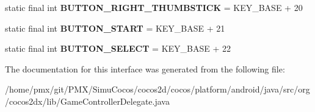 \begin{DoxyCompactItemize}
\item 
\mbox{\label{interfaceorg_1_1cocos2dx_1_1lib_1_1GameControllerDelegate_a57dc771b8eb196a53e62ec73d3569b28}} 
static final int {\bfseries B\+U\+T\+T\+O\+N\+\_\+\+R\+I\+G\+H\+T\+\_\+\+T\+H\+U\+M\+B\+S\+T\+I\+CK} = K\+E\+Y\+\_\+\+B\+A\+SE + 20
\item 
\mbox{\label{interfaceorg_1_1cocos2dx_1_1lib_1_1GameControllerDelegate_a2ddcf5d70780771554d0117c041673f6}} 
static final int {\bfseries B\+U\+T\+T\+O\+N\+\_\+\+S\+T\+A\+RT} = K\+E\+Y\+\_\+\+B\+A\+SE + 21
\item 
\mbox{\label{interfaceorg_1_1cocos2dx_1_1lib_1_1GameControllerDelegate_aa2229330e3cdfd1373d93f208ffa4579}} 
static final int {\bfseries B\+U\+T\+T\+O\+N\+\_\+\+S\+E\+L\+E\+CT} = K\+E\+Y\+\_\+\+B\+A\+SE + 22
\end{DoxyCompactItemize}


The documentation for this interface was generated from the following file\+:\begin{DoxyCompactItemize}
\item 
/home/pmx/git/\+P\+M\+X/\+Simu\+Cocos/cocos2d/cocos/platform/android/java/src/org/cocos2dx/lib/Game\+Controller\+Delegate.\+java\end{DoxyCompactItemize}
